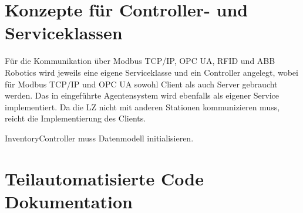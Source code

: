 \section{Konzepte für Controller- und Serviceklassen}

Für die Kommunikation über Modbus TCP/IP, OPC UA, RFID und ABB Robotics wird jeweils eine eigene Serviceklasse und ein
Controller angelegt, wobei für Modbus TCP/IP  und OPC UA sowohl Client als auch Server gebraucht werden.
Das in \cite{LarsKistner2017} eingeführte Agentensystem wird ebenfalls als eigener Service implementiert.
Da die LZ nicht mit anderen Stationen kommunizieren muss, reicht die Implementierung des Clients.


InventoryController muss Datenmodell initialisieren.
\section{Teilautomatisierte Code Dokumentation}